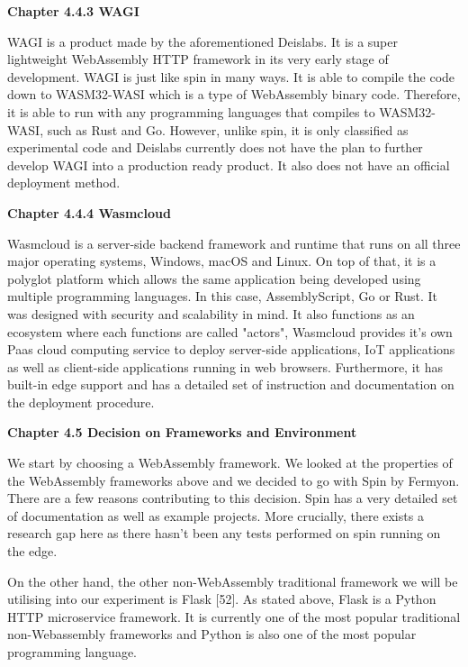 \bigskip
\textbf{{\normalsize Chapter 4.4.3 WAGI}}

WAGI is a product made by the aforementioned Deislabs. It is a super lightweight WebAssembly HTTP framework in its very early stage of development. WAGI is just like spin in many ways. It is able to compile the code down to WASM32-WASI which is a type of WebAssembly binary code. Therefore, it is able to run with any programming languages that compiles to WASM32-WASI, such as Rust and Go. However, unlike spin, it is only classified as experimental code and Deislabs currently does not have the plan to further develop WAGI into a production ready product. It also does not have an official deployment method.

\bigskip
\textbf{{\normalsize Chapter 4.4.4 Wasmcloud}}

Wasmcloud is a server-side backend framework and runtime that runs on all three major operating systems, Windows, macOS and Linux. On top of that, it is a polyglot platform which allows the same application being developed using multiple programming languages. In this case, AssemblyScript, Go or Rust. It was designed with security and scalability in mind. It also functions as an ecosystem where each functions are called "actors", Wasmcloud provides it's own Paas cloud computing service to deploy server-side applications, IoT applications as well as client-side applications running in web browsers. Furthermore, it has built-in edge support and has a detailed set of instruction and documentation on the deployment procedure.

\bigskip
\textbf{{\Large Chapter 4.5 Decision on Frameworks and Environment }}

We start by choosing a WebAssembly framework. We looked at the properties of the WebAssembly frameworks above and we decided to go with Spin by Fermyon. There are a few reasons contributing to this decision. Spin has a very detailed set of documentation as well as example projects. More crucially, there exists a research gap here as there hasn't been any tests performed on spin running on the edge.

On the other hand, the other non-WebAssembly traditional framework we will be utilising into our experiment is Flask [52]. As stated above, Flask is a Python HTTP microservice framework. It is currently one of the most popular traditional non-Webassembly frameworks and Python is also one of the most popular programming language.

